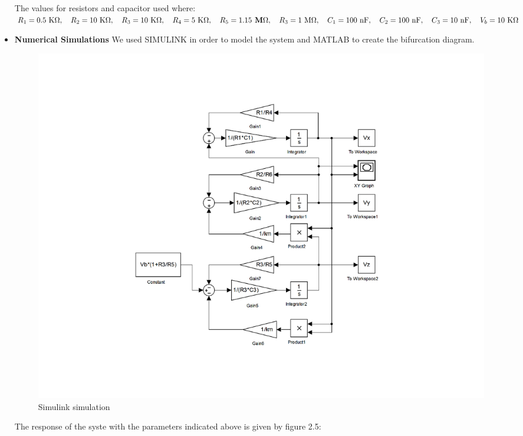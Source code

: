 \begin{itemize}
The values for resistors and capacitor used where: $R_1=0.5\text{ K}\Omega, \quad R_2=10\text{ K}\Omega, \quad R_3=10\text{ K}\Omega, \quad R_4=5\text{ K}\Omega, \quad R_5=1.15\textbf{\text{ M}}\Omega, \quad R_3=1\text{ M}\Omega, \quad C_1=100\text{ nF}, \quad C_2=100\text{ nF}, \quad C_3=10\text{ nF}, \quad V_b=10\text{ K}\Omega$
   \item \textbf{Numerical Simulations}
We used SIMULINK in order to model the system and MATLAB to create the bifurcation diagram.
            \begin{figure}[h]
            \centering
            \includegraphics[scale=0.4]{imagenes/2-benford/shilkinovsimu.png}
            \caption{Simulink simulation}
            \end{figure}
The response of the syste with the parameters indicated above is given by figure 2.5:


\end{itemize}
